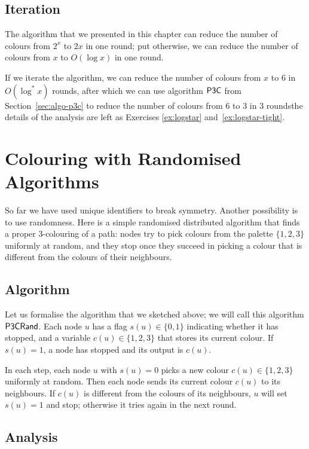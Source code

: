 \subsection{Iteration}

The algorithm that we presented in this chapter can reduce the number of colours from $2^x$ to $2x$ in one round; put otherwise, we can reduce the number of colours from $x$ to $O(\log x)$ in one round.

If we iterate the algorithm, we can reduce the number of colours from $x$ to $6$ in $O(\log^* x)$ rounds, after which we can use algorithm $\textsf{P3C}$ from Section~\ref{sec:algo-p3c} to reduce the number of colours from $6$ to $3$ in $3$ rounds\mydash the details of the analysis are left as Exercises \ref{ex:logstar} and~\ref{ex:logstar-tight}.


\section{Colouring with Randomised Algorithms}\label{sec:algo-p3crand}

So far we have used unique identifiers to break symmetry. Another possibility is to use randomness. Here is a simple randomised distributed algorithm that finds a proper $3$-colouring of a path: nodes try to pick colours from the palette $\{1,2,3\}$ uniformly at random, and they stop once they succeed in picking a colour that is different from the colours of their neighbours.


\subsection{Algorithm}

Let us formalise the algorithm that we sketched above; we will call this algorithm $\textsf{P3CRand}$. Each node $u$ has a flag $s(u) \in \{0,1\}$ indicating whether it has stopped, and a variable $c(u) \in \{1,2,3\}$ that stores its current colour. If $s(u) = 1$, a node has stopped and its output is $c(u)$.

In each step, each node $u$ with $s(u) = 0$ picks a new colour $c(u) \in \{1,2,3\}$ uniformly at random. Then each node sends its current colour $c(u)$ to its neighbours. If $c(u)$ is different from the colours of its neighbours, $u$ will set $s(u) = 1$ and stop; otherwise it tries again in the next round.


\subsection{Analysis}

